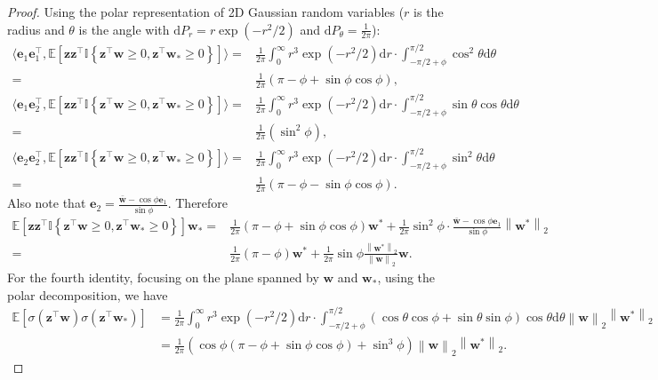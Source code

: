 \documentclass{article}
\newcommand{\vect}[1]{\mathbf{#1}}
\newcommand{\norm}[1]{\left\|#1\right\|}
\newcommand{\expect}{\mathbb{E}}
\newcommand{\diff}{\text{d}}
\newcommand{\indict}{\mathbb{I}}
\newcommand{\relu}[1]{\sigma\left(#1\right)}
\begin{document}
\begin{proof}
Using the polar representation of 2D Gaussian random variables ($r$ is the radius and $\theta$ is the angle with $\diff P_r = r\exp(-r^2/2)$ and $\diff P_\theta = \frac{1}{2\pi}$): \begin{align*}
\langle \vect{e}_1\vect{e}_1^\top, \expect\left[\vect{z}\vect{z}^\top\indict\left\{\vect{z}^\top\vect{w}\ge 0,\vect{z}^\top \vect{w}_*\ge 0\right\}\right] \rangle 
= & \frac{1}{2\pi}\int_{0}^{\infty} r^3\exp\left(-r^2/2\right) \diff r \cdot \int_{-\pi/2+\phi}^{\pi/2}\cos^2\theta \diff \theta  \\
= & \frac{1}{2\pi}\left(\pi-\phi +\sin\phi \cos\phi\right),\\
\langle \vect{e}_1\vect{e}_2^\top, \expect\left[\vect{z}\vect{z}^\top\indict\left\{\vect{z}^\top\vect{w}\ge 0,\vect{z}^\top \vect{w}_*\ge 0\right\}\right] \rangle 
= & \frac{1}{2\pi}\int_{0}^{\infty} r^3\exp\left(-r^2/2\right) \diff r \cdot \int_{-\pi/2+\phi}^{\pi/2}\sin\theta\cos\theta \diff \theta  \\
= & \frac{1}{2\pi}\left(\sin^2\phi\right),\\
\langle \vect{e}_2\vect{e}_2^\top, \expect\left[\vect{z}\vect{z}^\top\indict\left\{\vect{z}^\top\vect{w}\ge 0,\vect{z}^\top \vect{w}_*\ge 0\right\}\right] \rangle 
= & \frac{1}{2\pi}\int_{0}^{\infty} r^3\exp\left(-r^2/2\right) \diff r \cdot \int_{-\pi/2+\phi}^{\pi/2}\sin^2\theta \diff \theta  \\
= & \frac{1}{2\pi}\left(\pi - \phi -\sin\phi \cos\phi\right).
\end{align*}
Also note that $\vect{e}_2 = \frac{\bar{\vect{w}}-\cos \phi\vect{e}_1}{\sin\phi}$.
Therefore \begin{align*}
\expect\left[\vect{z}\vect{z}^\top\indict\left\{\vect{z}^\top\vect{w}\ge 0,\vect{z}^\top \vect{w}_*\ge 0\right\}\right]\vect{w}_* = &\frac{1}{2\pi}\left(\pi-\phi +\sin\phi \cos\phi\right)\vect{w}^* + \frac{1}{2\pi}\sin^2\phi\cdot \frac{\bar{\vect{w}}-\cos\phi\vect{e}_1}{\sin\phi}\norm{\vect{w}^*}_2 \\
= & \frac{1}{2\pi}\left(\pi-\phi\right)\vect{w}^* + \frac{1}{2\pi}\sin\phi\frac{\norm{\vect{w}^*}_2}{\norm{\vect{w}}_2}\vect{w}.
\end{align*}
For the fourth identity, focusing on the plane spanned by $\vect{w}$ and $\vect{w}_*$, using the polar decomposition, we have \begin{align*}
\expect\left[\relu{\vect{z}^\top\vect{w}}\relu{\vect{z}^\top\vect{w}_*}\right] &= \frac{1}{2\pi}\int_{0}^{\infty}r^3\exp\left(-r^2/2\right)\diff r\cdot \int_{-\pi/2+\phi}^{\pi/2} \left(\cos\theta\cos\phi+\sin\theta\sin\phi\right)\cos\theta \diff \theta \norm{\vect{w}}_2\norm{\vect{w}^*}_2\\
& = \frac{1}{2\pi}\left(\cos\phi\left(\pi-\phi+\sin\phi\cos\phi\right)+\sin^3\phi\right)\norm{\vect{w}}_2\norm{\vect{w}^*}_2.
\end{align*}
\end{proof}%
\end{document}
